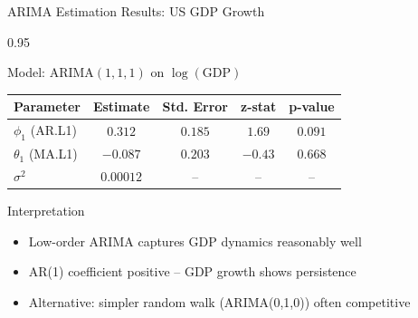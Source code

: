 \documentclass[9pt, aspectratio=169, t]{beamer}
\begin{document}
\begin{frame}{ARIMA Estimation Results: US GDP Growth}
    \begin{cminipage}{0.95\textwidth}
    {\small
    \begin{block}{Model: ARIMA$(1,1,1)$ on $\log(\text{GDP})$}
        \begin{center}
        \begin{tabular}{lcccc}
            \toprule
            \textbf{Parameter} & \textbf{Estimate} & \textbf{Std. Error} & \textbf{z-stat} & \textbf{p-value} \\
            \midrule
            $\phi_1$ (AR.L1) & $0.312$ & $0.185$ & $1.69$ & $0.091$ \\
            $\theta_1$ (MA.L1) & $-0.087$ & $0.203$ & $-0.43$ & $0.668$ \\
            $\sigma^2$ & $0.00012$ & -- & -- & -- \\
            \bottomrule
        \end{tabular}
        \end{center}
    \end{block}

    \vspace{0.2cm}

    \begin{block}{Interpretation}
        \begin{itemize}\setlength{\itemsep}{0pt}
            \item Low-order ARIMA captures GDP dynamics reasonably well
            \item AR(1) coefficient positive -- GDP growth shows persistence
            \item Alternative: simpler random walk (ARIMA(0,1,0)) often competitive
        \end{itemize}
    \end{block}
    }
    \end{cminipage}
\end{frame}
\end{document}
